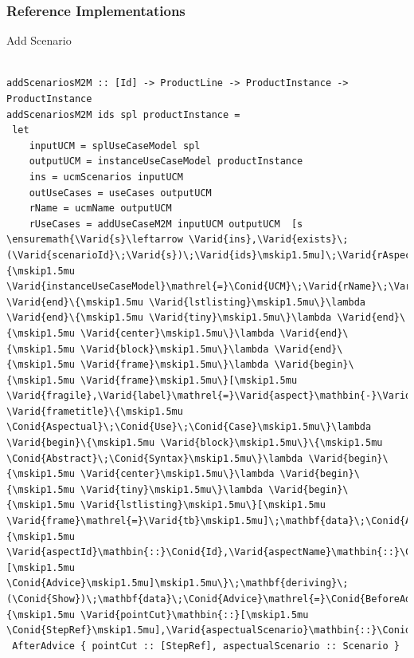 \documentclass[xcolor=svgnames]{beamer}
\newcommand{\Conid}[1]{\mathit{#1}}
\newcommand{\Varid}[1]{\mathit{#1}}
\begin{document}
\begin{frame}[fragile,label=addScenario-weaver]
\frametitle{Reference Implementations}

\begin{block}{Add Scenario}
\begin{center}
\begin{tiny}
\begin{lstlisting}[frame=tb]

addScenariosM2M :: [Id] -> ProductLine -> ProductInstance -> ProductInstance
addScenariosM2M ids spl productInstance =
 let
 	inputUCM = splUseCaseModel spl
 	outputUCM = instanceUseCaseModel productInstance
	ins = ucmScenarios inputUCM
	outUseCases = useCases outputUCM
	rName = ucmName outputUCM
	rUseCases = addUseCaseM2M inputUCM outputUCM  [s \ensuremath{\Varid{s}\leftarrow \Varid{ins},\Varid{exists}\;(\Varid{scenarioId}\;\Varid{s})\;\Varid{ids}\mskip1.5mu]\;\Varid{rAspects}\mathrel{=}\Varid{aspects}\;\Varid{outputUCM}\;\mathbf{in}\;\Varid{productInstance}\{\mskip1.5mu \Varid{instanceUseCaseModel}\mathrel{=}\Conid{UCM}\;\Varid{rName}\;\Varid{rUseCases}\;\Varid{rAspects}\mskip1.5mu\}\lambda \Varid{end}\{\mskip1.5mu \Varid{lstlisting}\mskip1.5mu\}\lambda \Varid{end}\{\mskip1.5mu \Varid{tiny}\mskip1.5mu\}\lambda \Varid{end}\{\mskip1.5mu \Varid{center}\mskip1.5mu\}\lambda \Varid{end}\{\mskip1.5mu \Varid{block}\mskip1.5mu\}\lambda \Varid{end}\{\mskip1.5mu \Varid{frame}\mskip1.5mu\}\lambda \Varid{begin}\{\mskip1.5mu \Varid{frame}\mskip1.5mu\}[\mskip1.5mu \Varid{fragile},\Varid{label}\mathrel{=}\Varid{aspect}\mathbin{-}\Varid{code}\mskip1.5mu]\lambda \Varid{frametitle}\{\mskip1.5mu \Conid{Aspectual}\;\Conid{Use}\;\Conid{Case}\mskip1.5mu\}\lambda \Varid{begin}\{\mskip1.5mu \Varid{block}\mskip1.5mu\}\{\mskip1.5mu \Conid{Abstract}\;\Conid{Syntax}\mskip1.5mu\}\lambda \Varid{begin}\{\mskip1.5mu \Varid{center}\mskip1.5mu\}\lambda \Varid{begin}\{\mskip1.5mu \Varid{tiny}\mskip1.5mu\}\lambda \Varid{begin}\{\mskip1.5mu \Varid{lstlisting}\mskip1.5mu\}[\mskip1.5mu \Varid{frame}\mathrel{=}\Varid{tb}\mskip1.5mu]\;\mathbf{data}\;\Conid{AspectualUseCase}\mathrel{=}\Conid{AspectualUseCase}\{\mskip1.5mu \Varid{aspectId}\mathbin{::}\Conid{Id},\Varid{aspectName}\mathbin{::}\Conid{Name},\Varid{advices}\mathbin{::}[\mskip1.5mu \Conid{Advice}\mskip1.5mu]\mskip1.5mu\}\;\mathbf{deriving}\;(\Conid{Show})\;\mathbf{data}\;\Conid{Advice}\mathrel{=}\Conid{BeforeAdvice}\{\mskip1.5mu \Varid{pointCut}\mathbin{::}[\mskip1.5mu \Conid{StepRef}\mskip1.5mu],\Varid{aspectualScenario}\mathbin{::}\Conid{Scenario}\mskip1.5mu\}} 
 AfterAdvice { pointCut :: [StepRef], aspectualScenario :: Scenario }

\end{lstlisting}
\end{tiny}
\end{center}
\end{block}
\end{frame}
\end{document}
